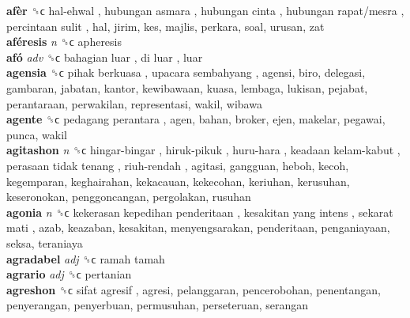 \textbf{afèr} ␝ϲ   hal-ehwal ,  hubungan asmara ,  hubungan cinta ,  hubungan rapat/mesra ,  percintaan sulit , hal, jirim, kes, majlis, perkara, soal, urusan, zat  \\
\textbf{aféresis} \emph{n}  ␝ϲ  apheresis  \\
\textbf{afó} \emph{adv}  ␝ϲ   bahagian luar ,  di luar , luar  \\
\textbf{agensia} ␝ϲ   pihak berkuasa ,  upacara sembahyang , agensi, biro, delegasi, gambaran, jabatan, kantor, kewibawaan, kuasa, lembaga, lukisan, pejabat, perantaraan, perwakilan, representasi, wakil, wibawa  \\
\textbf{agente} ␝ϲ   pedagang perantara , agen, bahan, broker, ejen, makelar, pegawai, punca, wakil  \\
\textbf{agitashon} \emph{n}  ␝ϲ   hingar-bingar ,  hiruk-pikuk ,  huru-hara ,  keadaan kelam-kabut ,  perasaan tidak tenang ,  riuh-rendah , agitasi, gangguan, heboh, kecoh, kegemparan, keghairahan, kekacauan, kekecohan, keriuhan, kerusuhan, keseronokan, penggoncangan, pergolakan, rusuhan  \\
\textbf{agonia} \emph{n}  ␝ϲ   kekerasan kepedihan penderitaan ,  kesakitan yang intens ,  sekarat mati , azab, keazaban, kesakitan, menyengsarakan, penderitaan, penganiayaan, seksa, teraniaya  \\
\textbf{agradabel} \emph{adj}  ␝ϲ   ramah tamah   \\
\textbf{agrario} \emph{adj}  ␝ϲ  pertanian  \\
\textbf{agreshon} ␝ϲ   sifat agresif , agresi, pelanggaran, pencerobohan, penentangan, penyerangan, penyerbuan, permusuhan, perseteruan, serangan  \\
